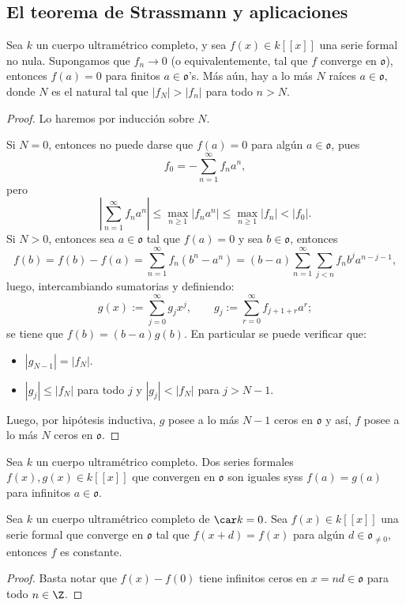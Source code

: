 \documentclass[teoria-numeros.tex]{subfiles}
\begin{document}
\subsection{El teorema de Strassmann y aplicaciones}
\begin{thmi}
	Sea $k$ un cuerpo ultramétrico completo, y sea $f(x) \in k[[x]]$ una serie formal no nula.
	Supongamos que $f_n \to 0$ (o equivalentemente, tal que $f$ converge en $\mathfrak{o}$), entonces $f(a) = 0$ para finitos $a \in \mathfrak{o}$'s.
	Más aún, hay a lo más $N$ raíces $a \in \mathfrak{o}$, donde $N$ es el natural tal que $|f_N| > |f_n|$ para todo $n > N$.
\end{thmi}
\begin{proof}
	Lo haremos por inducción sobre $N$.

	Si $N = 0$, entonces no puede darse que $f(a) = 0$ para algún $a \in \mathfrak{o}$, pues
	$$ f_0 = - \sum_{n=1}^{\infty} f_na^n, $$
	pero
	$$ \left| \sum_{n=1}^{\infty} f_na^n \right| \le \max_{n\ge 1} |f_n a^n| \le \max_{n\ge 1} |f_n| < |f_0|. $$
	Si $N > 0$, entonces sea $a \in \mathfrak{o}$ tal que $f(a) = 0$ y sea $b \in \mathfrak{o}$, entonces
	$$ f(b) = f(b) - f(a) = \sum_{n=1}^{\infty} f_n(b^n - a^n) = (b - a) \sum_{n=1}^{\infty} \sum_{j < n} f_n b^j a^{n-j-1}, $$
	luego, intercambiando sumatorias y definiendo:
	$$ g(x) := \sum_{j=0}^{\infty} g_j x^j, \qquad g_j := \sum_{r=0}^{\infty} f_{j+1+r} a^r; $$
	se tiene que $f(b) = (b - a) g(b)$.
	En particular se puede verificar que:
	\begin{itemize}
		\item $|g_{N-1}| = |f_N|$.
		\item $|g_j| \le |f_N|$ para todo $j$ y $|g_j| < |f_N|$ para $j > N - 1$.
	\end{itemize}
	Luego, por hipótesis inductiva, $g$ posee a lo más $N - 1$ ceros en $\mathfrak{o}$ y así, $f$ posee a lo más $N$ ceros en $\mathfrak{o}$.
\end{proof}

\begin{cor}
	Sea $k$ un cuerpo ultramétrico completo.
	Dos series formales $f(x), g(x) \in k[[x]]$ que convergen en $\mathfrak{o}$ son iguales syss $f(a) = g(a)$ para infinitos $a \in \mathfrak{o}$.
\end{cor}
\begin{cor}
	Sea $k$ un cuerpo ultramétrico completo de $\car k = 0$.
	Sea $f(x) \in k[[x]]$ una serie formal que converge en $\mathfrak{o}$ tal que $f(x + d) = f(x)$ para algún $d \in \mathfrak{o}_{\ne 0}$,
	entonces $f$ es constante.
\end{cor}
\begin{proof}
	Basta notar que $f(x) - f(0)$ tiene infinitos ceros en $x = nd \in \mathfrak{o}$ para todo $n \in \Z$.
\end{proof}
\end{document}
